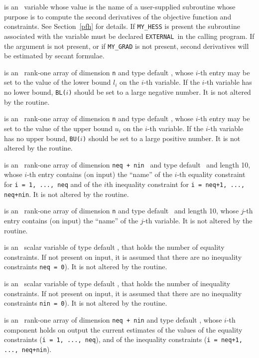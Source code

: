 \documentclass{galahad}
\newcommand{\external}{{\tt EXTERNAL}}
\begin{document}
\begin{description}
 is an \optional\ variable whose value is the name of a 
user-supplied subroutine whose purpose is to compute the second derivatives
of the objective function and constraints. See Section~\ref{pfh} for details. 
If {\tt MY\_HESS} is present the subroutine associated with the variable must be 
declared \external\ in the calling program. If the argument is not present,
or if {\tt MY\_GRAD} is not present,
second derivatives will be estimated by secant formulae. 

 is an \optional\ rank-one array of dimension {\tt n} and type 
 default \realdp, whose $i$-th entry may be set
to the value of the lower bound $l_i$ on the $i$-th variable.
If the $i$-th variable has no lower bound, {\tt BL($i$)} should be set to
a large negative number. It is not altered by the routine.

 is an \optional\ rank-one array of dimension {\tt n} and type 
default \realdp, whose $i$-th entry may be set
to the value of the upper bound $u_i$ on the $i$-th variable.
If the $i$-th variable has no upper bound, {\tt BU($i$)} should be set to
a large positive number.  It is not altered by the routine.

 is an \optional\  rank-one array of dimension {\tt neq + nin }
and type default \character\ and length 10, whose $i$-th entry contains (on
input) the ``name'' of the $i$-th equality constraint  for 
{\tt i = 1, ..., neq} and of the $i$th inequality constraint for 
{\tt i = neq+1, ..., neq+nin}.  It is not altered by the routine.

 is an \optional\ rank-one array of dimension {\tt n} and type 
default \character\ and length 10, whose $j$-th entry contains (on input) the
``name'' of the $j$-th variable.  It is not altered by the routine.

 is an \optional\ scalar variable of type default \integer, that holds
the number of equality constraints. If not present on input, it is assumed
that there are no inequality constraints {\tt neq = 0}). It is not altered by
the routine. 

 is an \optional\ scalar variable of type default \integer, that holds 
the number of inequality constraints. If not present on input, it is assumed
that there are no inequality constraints {\tt nin = 0}). It is not altered by
the routine.

 is an \optional\ rank-one array of dimension {\tt neq + nin} and type 
default \realdp, whose $i$-th component holds on output the current
estimates of the values of the equality constraints ({\tt i = 1, ..., neq}),
and of the inequality constraints  ({\tt i = neq+1, ..., neq+nin}).


\end{description}
\end{document}
